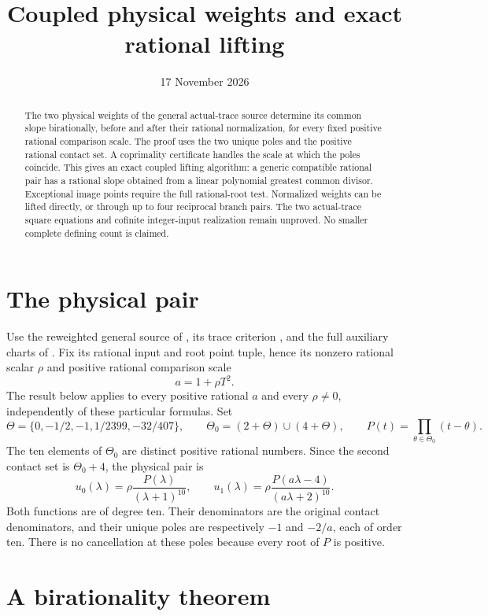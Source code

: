 \documentclass[11pt,a4paper]{article}
\title{Coupled physical weights and exact rational lifting}
\author{}\date{17 November 2026}
\begin{document}
\maketitle
\begin{abstract}
The two physical weights of the general actual-trace
source determine its common slope birationally, before and after
their rational normalization, for every fixed
positive rational comparison scale. The proof uses the two unique
poles and the positive rational contact set. A coprimality certificate
handles the scale at which the poles coincide. This gives an exact
coupled lifting algorithm: a generic compatible rational pair has a
rational slope obtained from a linear polynomial greatest common
divisor. Exceptional image points require the full rational-root
test. Normalized weights can be lifted directly, or through up to
four reciprocal branch pairs.
The two actual-trace square equations and cofinite integer-input
realization remain unproved. No smaller complete defining count is
claimed.
\end{abstract}

\section{The physical pair}

Use the reweighted general source of \cite{Reweighted}, its trace
criterion \cite{Trace}, and the full auxiliary charts of \cite{Auxiliary}.
Fix its rational input and root point tuple, hence its nonzero rational
scalar $\rho$ and positive rational comparison scale
\[
                    a=1+\rho T^2.
\]
The result below applies to every positive rational $a$ and every
$\rho\ne0$, independently of these particular formulas.
Set
\[
 \Theta=\{0,-1/2,-1,1/2399,-32/407\},\qquad
 \Theta_0=(2+\Theta)\cup(4+\Theta),\qquad
 P(t)=\prod_{\theta\in\Theta_0}(t-\theta).
\]
The ten elements of $\Theta_0$ are distinct positive rational numbers.
Since the second contact set is $\Theta_0+4$, the physical pair is
\begin{equation}\label{eq:pair}
 u_0(\lambda)=\rho\frac{P(\lambda)}{(\lambda+1)^{10}},\qquad
 u_1(\lambda)=\rho\frac{P(a\lambda-4)}{(a\lambda+2)^{10}}.
\end{equation}
Both functions are of degree ten. Their denominators are the original
contact denominators, and their unique poles are respectively $-1$
and $-2/a$, each of order ten. There is no cancellation at these
poles because every root of $P$ is positive.

\section{A birationality theorem}
\end{document}
